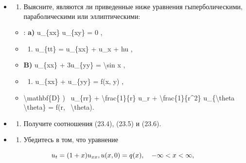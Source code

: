 \documentclass[
]{article}
\providecommand{\tightlist}{%
  \setlength{\itemsep}{0pt}\setlength{\parskip}{0pt}}
\begin{document}
\begin{itemize}
\item
  \begin{enumerate}
  \def\labelenumi{\arabic{enumi}.}
  \tightlist
  \item
    Выясните, являются ли приведенные ниже уравнения гыперболическими,
    параболическими или эллиптическими:
  \end{enumerate}

  \begin{itemize}
  \item
    : \textbf{a)} u\_\{xx\} u\_\{xy\} = 0 ,
  \item
    \begin{enumerate}
    \def\labelenumi{\arabic{enumi})}
    \setcounter{enumi}{5}
    \tightlist
    \item
      u\_\{tt\} = u\_\{xx\} + u\_x + hu ,
    \end{enumerate}
  \item
    \textbf{B)} u\_\{xx\} + 3u\_\{yy\} = \textbackslash sin x ,
  \item
    \begin{enumerate}
    \def\labelenumi{\alph{enumi})}
    \setcounter{enumi}{17}
    \tightlist
    \item
      u\_\{xx\} + u\_\{yy\} = f(x, y) ,
    \end{enumerate}
  \item
    \textbackslash mathbf\{D\} ) ~u\_\{rr\} +
    \textbackslash frac\{1\}\{r\} u\_r +
    \textbackslash frac\{1\}\{r\^{}2\} u\_\{\textbackslash theta
    \textbackslash theta\} = f(r, ~\textbackslash theta).
  \end{itemize}
\item
  \begin{enumerate}
  \def\labelenumi{\arabic{enumi}.}
  \setcounter{enumi}{1}
  \tightlist
  \item
    Получите соотношения (23.4), (23.5) и (23.6).
  \end{enumerate}
\item
  \begin{enumerate}
  \def\labelenumi{\arabic{enumi}.}
  \setcounter{enumi}{2}
  \tightlist
  \item
    Убедитесь в том, что уравнение
  \end{enumerate}
\end{itemize}

\[
u_t = (1+x) u_{xx}, \\ u(x, 0) = q(x), \quad -\infty < x < \infty,
\]
\end{document}
